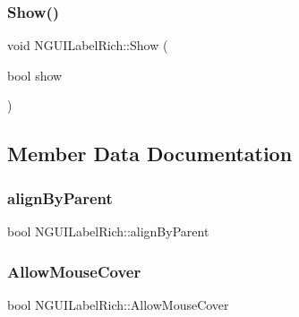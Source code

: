 \hypertarget{class_n_g_u_i_label_rich_a25677f020dfba6f7d8ad21432fa06669}{}\label{class_n_g_u_i_label_rich_a25677f020dfba6f7d8ad21432fa06669} 
\subsubsection{\texorpdfstring{Show()}{Show()}}
{\footnotesize\ttfamily void N\+G\+U\+I\+Label\+Rich\+::\+Show (\begin{DoxyParamCaption}\item[{bool}]{show }\end{DoxyParamCaption})}



\subsection{Member Data Documentation}
\hypertarget{class_n_g_u_i_label_rich_a396211589009fbe2e853e5f8eb9db30a}{}\label{class_n_g_u_i_label_rich_a396211589009fbe2e853e5f8eb9db30a} 
\subsubsection{\texorpdfstring{align\+By\+Parent}{alignByParent}}
{\footnotesize\ttfamily bool N\+G\+U\+I\+Label\+Rich\+::align\+By\+Parent}

\hypertarget{class_n_g_u_i_label_rich_a55edc20f7ec94841c33ac34974400e6e}{}\label{class_n_g_u_i_label_rich_a55edc20f7ec94841c33ac34974400e6e} 
\subsubsection{\texorpdfstring{Allow\+Mouse\+Cover}{AllowMouseCover}}
{\footnotesize\ttfamily bool N\+G\+U\+I\+Label\+Rich\+::\+Allow\+Mouse\+Cover}

\hypertarget{class_n_g_u_i_label_rich_abb9da524c9ae78cf962ce8d87ac9d5c6}{}\label{class_n_g_u_i_label_rich_abb9da524c9ae78cf962ce8d87ac9d5c6} 
